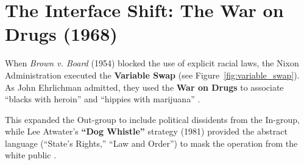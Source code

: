 \documentclass[12pt,openany]{book}
\begin{document}
\section{The Interface Shift: The War on Drugs (1968)}
When \textit{Brown v. Board} (1954) blocked the use of explicit racial laws, the Nixon Administration executed the \textbf{Variable Swap} (see Figure~\ref{fig:variable_swap}). As John Ehrlichman admitted, they used the \textbf{War on Drugs} to associate ``blacks with heroin'' and ``hippies with marijuana'' \cite{baum, vera, alexander, webb}.

This expanded the Out-group to include political dissidents from the In-group, while Lee Atwater's \textbf{``Dog Whistle''} strategy (1981) provided the abstract language (``State's Rights,'' ``Law and Order'') to mask the operation from the white public \cite{lopez, phillips}.
\end{document}
